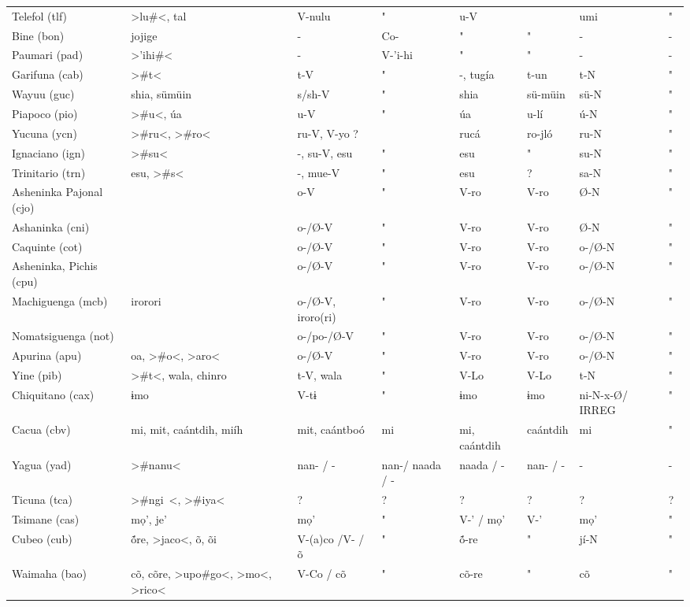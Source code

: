 \begin{landscape}
\begin{longtable}{*{8}{l}}
Telefol (tlf)	&	>lu\#<, tal	&	V-nulu	&	"	&	u-V	&		&	umi	&	"	\\
Bine (bon)	&	jojige	&	 -	&	Co-	&	" 	&	" 	&	 -	&	 -	\\
Paumari (pad)	&	>'ihi\#<	&	 -	&	 V-'i-hi	&	" 	&	"	&	 -	&	 -	\\
Garifuna (cab)	&	>\#t<	&	t-V	&	" 	&	 -, tugía 	&	t-un	&	t-N	&	" 	\\
Wayuu (guc)	&	shia, sümüin	&	s/sh-V	&	"	&	shia	&	sü-müin	&	sü-N	&	"	\\
Piapoco (pio)	&	>\#u<, úa	&	u-V	&	"	&	úa	&	u-lí	&	ú-N	&	"	\\
Yucuna (ycn)	&	>\#ru<, >\#ro<	&	ru-V, V-yo ?	&		&	rucá	&	ro-jló	&	ru-N	&	"	\\
Ignaciano (ign)	&	>\#su<	&	 -, su-V, esu	&	" 	&	esu	&	" 	&	su-N	&	" 	\\
Trinitario (trn)	&	esu, >\#s<	&	 -, mue-V	&	" 	&	esu	&	?	&	sa-N	&	" 	\\
Asheninka Pajonal (cjo)	&		&	o-V	&	"	&	V-ro	&	V-ro	&	Ø-N	&	"	\\
Ashaninka (cni)	&		&	o-/Ø-V	&	"	&	V-ro	&	V-ro	&	Ø-N	&	"	\\
Caquinte (cot)	&		&	o-/Ø-V	&	"	&	V-ro	&	V-ro	&	o-/Ø-N	&	"	\\
Asheninka, Pichis (cpu)	&		&	o-/Ø-V	&	"	&	V-ro	&	V-ro	&	o-/Ø-N	&	"	\\
Machiguenga (mcb)	&	irorori	&	o-/Ø-V, iroro(ri)	&	"	&	V-ro	&	V-ro	&	o-/Ø-N	&	"	\\
Nomatsiguenga (not)	&		&	o-/po-/Ø-V	&	"	&	V-ro	&	V-ro	&	o-/Ø-N	&	"	\\
Apurina (apu)	&	oa, >\#o<, >aro<	&	o-/Ø-V	&	"	&	V-ro	&	V-ro	&	o-/Ø-N	&	"	\\
Yine (pib)	&	>\#t<, wala, {chinro}	&	t-V, wala	&	" 	&	V-Lo	&	V-Lo	&	 t-N	&	" 	\\
Chiquitano (cax)	&	ɨmo	&	V-tɨ	&	" 	&	ɨmo	&	ɨmo 	&	ni-N-x-Ø/ IRREG	&	" 	\\
Cacua (cbv)	&	mi, mit, caántdih, miíh	&	mit, caántboó 	&	mi	&	mi, caántdih 	&	caántdih 	&	mi	&	" 	\\
Yagua (yad)	&	>\#nanu<	&	nan- / -	&	nan-/ naada / -	&	naada / -	&	nan- / -	&	 -	&	-	\\
Ticuna (tca)	&	>\#ngi~<, >\#iya<	&	?	&	?	&	?	&	?	&	?	&	?	\\
Tsimane (cas)	&	mọ’, {je'}	&	mọ’	&	"	&	V-’ / mọ’	&	V-’	&	mọ’	&	"	\\
Cubeo (cub)	&	ṍre, >jaco<, õ, õi	&	V-(a)co /V- / õ	&	"	&	ṍ-re 	&	"	&	jí-N	&	"	\\
Waimaha (bao)	&	cõ, cõre, >upo\#<, >go<, >mo<, {>rico<}	&	V-Co / cõ	&	"	&	cõ-re 	&	"	&	cõ	&	"	\\

\end{longtable}
\end{landscape}
